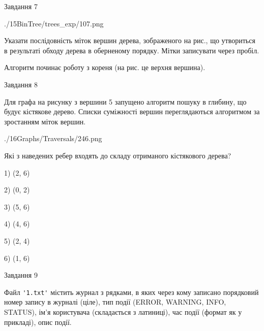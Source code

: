 \documentclass[12pt, ukrainian]{article}
\def\code#1{\Verb!#1!}
\begin{document}
{\vspace{10mm}\par

\newpage
\begin{minipage}[t]{9.7cm}
               
{\begin{center}Завдання {7}\end{center}}
\vspace{-6mm}

\begin{center}
	{./15BinTree/trees_exp/107.png}
\end{center}
Указати послідовність міток вершин дерева, зображеного на рис., що утвориться в результаті обходу дерева в оберненому порядку. Мітки записувати через пробіл.\par Алгоритм починає роботу з кореня (на рис. це верхня вершина).\par

\end{minipage}
\vline \hspace{8mm}
\begin{minipage}[t]{8.0cm}
               
{\begin{center}Завдання {8}\end{center}}
\vspace{-6mm}
Для графа на рисунку з вершини 5 запущено алгоритм пошуку в глибину, що будує кістякове дерево. Списки суміжності вершин переглядаються алгоритмом за зростанням міток вершин.\par
\begin{center}
	{./16Graphs/Traversals/246.png}
\end{center}
\par Які з наведених ребер входять до складу отриманого кістякового дерева?\par
1) (2, 6)\par
2) (0, 2)\par
3) (5, 6)\par
4) (4, 6)\par
5) (2, 4)\par
6) (1, 6)\par
{\vskip 15pt} \par

\end{minipage}

               
{\begin{center}Завдання {9}\end{center}}
\vspace{-6mm}
Файл \code{'1.txt'} містить журнал з рядками, в яких через кому записано поряд\-ко\-вий номер запису в журналі (ціле), тип події (ERROR, WARNING, INFO, STATUS), ім'я користувача (складається з латиниці), час події (фор\-мат як у прикладі), опис події.

}
\end{document}
